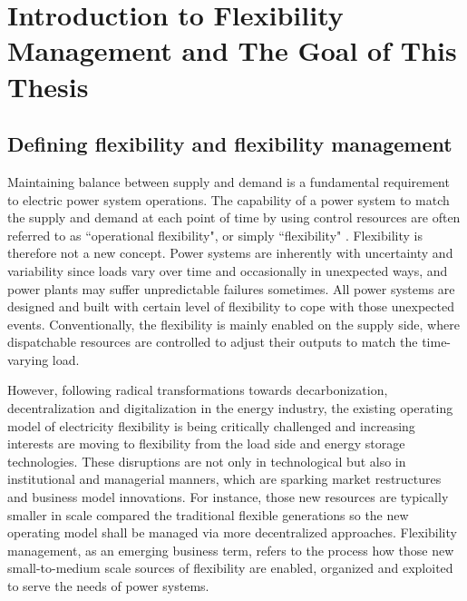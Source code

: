 \chapter{Introduction to Flexibility Management and The Goal of This Thesis}
\label{ch:introduction}

\section{Defining flexibility and flexibility management}
Maintaining balance between supply and demand is a fundamental requirement to electric power system operations. The capability of a power system to match the supply and demand at each point of time by using control resources are often referred to as ``operational flexibility", or simply ``flexibility" \cite{Cochran2014,Wang2017,Lund2015,Delft}. Flexibility is therefore not a new concept. Power systems are inherently with uncertainty and variability since loads vary over time and occasionally in unexpected ways, and power plants may suffer unpredictable failures sometimes. All power systems are designed and built with certain level of flexibility to cope with those unexpected events. Conventionally, the flexibility is mainly enabled on the supply side, where dispatchable resources are controlled to adjust their outputs to match the time-varying load.

However, following radical transformations towards decarbonization, decentralization and digitalization in the energy industry, the existing operating model of electricity flexibility is being critically challenged and increasing interests are moving to flexibility from the load side and energy storage technologies\cite{Lund2015,Bronski2015,McKinsey&Company2010}. These disruptions are not only in technological but also in institutional and managerial manners, which are sparking market restructures and business model innovations. For instance, those new resources are typically smaller in scale compared the traditional flexible generations so the new operating model shall be managed via more decentralized approaches. Flexibility management, as an emerging business term, refers to the process how those new small-to-medium scale sources of flexibility are enabled, organized and exploited to serve the needs of power systems.

